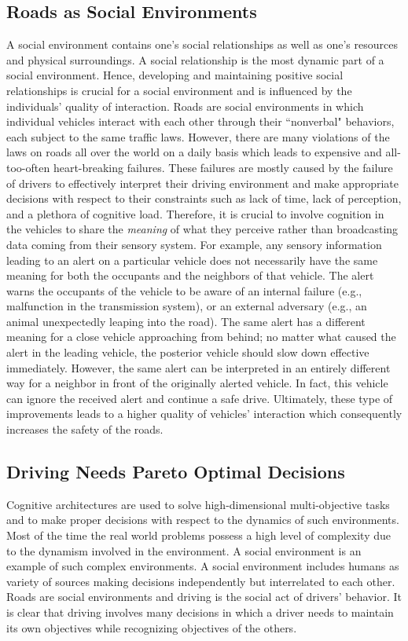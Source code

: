 \documentclass[journal, 11pt]{IEEEtran}
\begin{document}
\subsection{Roads as Social Environments}

A social environment contains one's social relationships as well as one's
resources and physical surroundings. A social relationship is the most dynamic
part of a social environment. Hence, developing and maintaining positive social
relationships is crucial for a social environment and is influenced by the
individuals' quality of interaction. Roads are social environments in which
individual vehicles interact with each other through their ``nonverbal"
behaviors, each subject to the same traffic laws. However, there are many
violations of the laws on roads all over the world on a daily basis which
leads to expensive and all-too-often heart-breaking failures. These failures are
mostly caused by the failure of drivers to effectively interpret their driving
environment and make appropriate decisions with respect to their constraints
such as lack of time, lack of perception, and a plethora of cognitive load.
Therefore, it is crucial to involve cognition in the vehicles to share the
\textit{meaning} of what they perceive rather than broadcasting data coming
from their sensory system. For example, any sensory information leading to an
alert on a particular vehicle does not necessarily have the same meaning for
both the occupants and the neighbors of that vehicle. The alert warns the
occupants of the vehicle to be aware of an internal failure (e.g., malfunction
in the transmission system), or an external adversary (e.g., an animal
unexpectedly leaping into the road). The same alert has a different meaning
for a close vehicle approaching from behind; no matter what caused the alert
in the leading vehicle, the posterior vehicle should slow down effective
immediately. However, the same alert can be interpreted in an entirely different
way for a neighbor in front of the originally alerted vehicle. In fact, this
vehicle can ignore the received alert and continue a safe drive. Ultimately,
these type of improvements leads to a higher quality of vehicles' interaction
which consequently increases the safety of the roads.

\subsection{Driving Needs Pareto Optimal Decisions}

Cognitive architectures are used to solve high-dimensional multi-objective
tasks and to make proper decisions with respect to the dynamics of such
environments. Most of the time the real world problems possess a high level of
complexity due to the dynamism involved in the environment. A social environment
is an example of such complex environments. A social environment includes humans
as variety of sources making decisions independently but interrelated to each
other. Roads are social environments and driving is the social act of drivers'
behavior. It is clear that driving involves many decisions in which a driver
needs to maintain its own objectives while recognizing objectives of the others.
\end{document}
